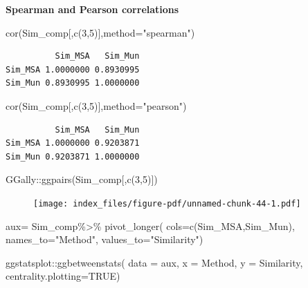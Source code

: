\documentclass[
  letterpaper,
  DIV=11,
  numbers=noendperiod]{scrreprt}
\newenvironment{Shaded}{}{}
\newcommand{\AttributeTok}[1]{\textcolor[rgb]{0.78,0.47,0.87}{#1}}
\newcommand{\ConstantTok}[1]{\textcolor[rgb]{0.82,0.60,0.40}{#1}}
\newcommand{\DecValTok}[1]{\textcolor[rgb]{0.82,0.60,0.40}{#1}}
\newcommand{\FunctionTok}[1]{\textcolor[rgb]{0.38,0.69,0.94}{#1}}
\newcommand{\NormalTok}[1]{\textcolor[rgb]{0.67,0.70,0.75}{#1}}
\newcommand{\OtherTok}[1]{\textcolor[rgb]{0.15,0.68,0.38}{#1}}
\newcommand{\SpecialCharTok}[1]{\textcolor[rgb]{0.34,0.71,0.76}{#1}}
\newcommand{\StringTok}[1]{\textcolor[rgb]{0.60,0.76,0.47}{#1}}
\begin{document}
\textbf{Spearman and Pearson correlations}

\begin{Shaded}
\begin{Highlighting}[]
\FunctionTok{cor}\NormalTok{(Sim\_comp[,}\FunctionTok{c}\NormalTok{(}\DecValTok{3}\NormalTok{,}\DecValTok{5}\NormalTok{)],}\AttributeTok{method=}\StringTok{"spearman"}\NormalTok{)}
\end{Highlighting}
\end{Shaded}

\begin{verbatim}
          Sim_MSA   Sim_Mun
Sim_MSA 1.0000000 0.8930995
Sim_Mun 0.8930995 1.0000000
\end{verbatim}

\begin{Shaded}
\begin{Highlighting}[]
\FunctionTok{cor}\NormalTok{(Sim\_comp[,}\FunctionTok{c}\NormalTok{(}\DecValTok{3}\NormalTok{,}\DecValTok{5}\NormalTok{)],}\AttributeTok{method=}\StringTok{"pearson"}\NormalTok{)}
\end{Highlighting}
\end{Shaded}

\begin{verbatim}
          Sim_MSA   Sim_Mun
Sim_MSA 1.0000000 0.9203871
Sim_Mun 0.9203871 1.0000000
\end{verbatim}

\begin{Shaded}
\begin{Highlighting}[]
\NormalTok{GGally}\SpecialCharTok{::}\FunctionTok{ggpairs}\NormalTok{(Sim\_comp[,}\FunctionTok{c}\NormalTok{(}\DecValTok{3}\NormalTok{,}\DecValTok{5}\NormalTok{)])}
\end{Highlighting}
\end{Shaded}

\begin{figure}[H]

{\centering \texttt{[image: index\_files/figure-pdf/unnamed-chunk-44-1.pdf]}

}

\end{figure}

\begin{Shaded}
\begin{Highlighting}[]
\NormalTok{aux}\OtherTok{=}\NormalTok{ Sim\_comp}\SpecialCharTok{\%\textgreater{}\%} \FunctionTok{pivot\_longer}\NormalTok{(}
  \AttributeTok{cols=}\FunctionTok{c}\NormalTok{(Sim\_MSA,Sim\_Mun),}
  \AttributeTok{names\_to=}\StringTok{"Method"}\NormalTok{,}
  \AttributeTok{values\_to=}\StringTok{"Similarity"}\NormalTok{)}

\NormalTok{ggstatsplot}\SpecialCharTok{::}\FunctionTok{ggbetweenstats}\NormalTok{(}
  \AttributeTok{data =}\NormalTok{ aux,}
  \AttributeTok{x =}\NormalTok{ Method,}
  \AttributeTok{y =}\NormalTok{ Similarity,}
  \AttributeTok{centrality.plotting=}\ConstantTok{TRUE}\NormalTok{)}
\end{Highlighting}
\end{Shaded}
\end{document}
